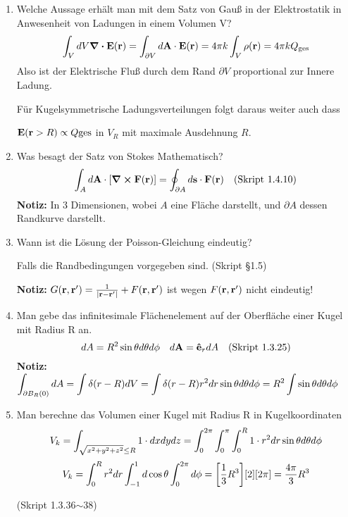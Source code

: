 \begin{enumerate}
  \item Welche Aussage erhält man mit dem Satz von Gauß in der 
        Elektrostatik in Anwesenheit von Ladungen in einem Volumen V?
        \begin{equation*}
          \int_V dV \div \vb E(\vb r) 
          = \int_{\partial V} d\vb A \cdot \vb E(\vb r) 
          = 4\pi k \int_V \rho(\vb r)
          = 4\pi k Q_{\text{ges}}
        \end{equation*}
        Also ist der Elektrische Fluß durch dem Rand $\partial V$ 
        proportional zur Innere Ladung.

        Für Kugelsymmetrische Ladungsverteilungen folgt daraus weiter auch
        dass 
        \begin{center}
        $\vb E(\vb r > R)\propto Q{\text{ges}}$ in $V_R$ mit maximale
        Ausdehnung $R$.
        \end{center}

  \item Was besagt der Satz von Stokes Mathematisch?
        $$\displaystyle \int_A d\vb A \cdot \qty[\curl \vb F(\vb r)]=
         \oint_{\partial A}d\vb s\cdot \vb F(\vb r)
         \quad\text{(Skript 1.4.10)}$$
        \textbf{Notiz:} In 3 Dimensionen, wobei $A$ eine Fläche 
        darstellt,
        und $\partial A$ dessen Randkurve darstellt.

  \item Wann ist die Lösung der Poisson-Gleichung eindeutig?
        \begin{center}
          Falls die Randbedingungen vorgegeben sind. (Skript §1.5)
        \end{center}
        \textbf{Notiz:} $G(\vb r, \vb r')=\frac{1}{\abs{\vb{r}-\vb{r}'}} + F(\vb r, \vb r')$ 
        ist wegen $F(\vb r, \vb r')$ nicht eindeutig!
        
  \item Man gebe das infinitesimale Flächenelement auf der Oberfläche 
        einer Kugel mit Radius R an.
        $$\displaystyle dA = R^2\sin\theta d\theta d\phi
        \quad d\vb A = \vu e_r dA \quad\text{(Skript 1.3.25)}$$
        \textbf{Notiz:} $\displaystyle\int_{\partial B_R(0)} dA=\int\delta(r-R)dV
         =\int \delta(r-R)r^2dr\sin\theta d\theta d\phi
         =R^2 \int \sin\theta d\theta d\phi$

  \item Man berechne das Volumen einer Kugel mit Radius R 
        in Kugelkoordinaten\\
        $$\displaystyle V_k=\int_{\sqrt{x^2+y^2+z^2}\le R} 1\cdot dxdydz
         =\int_0^{2\pi}\int_0^\pi\int_0^R 1\cdot r^2dr 
          \sin\theta d\theta d\phi$$
        $$\displaystyle V_k=\int_0^R r^2 dr \int_{-1}^{1} d\cos\theta 
                 \int_0^{2\pi}d\phi
         =\qty[\frac{1}{3}R^3]\qty[2]\qty[2\pi]=\frac{4\pi}{3}R^3$$
        \begin{center}
          (Skript 1.3.36$\sim$38)
        \end{center}


\end{enumerate}
